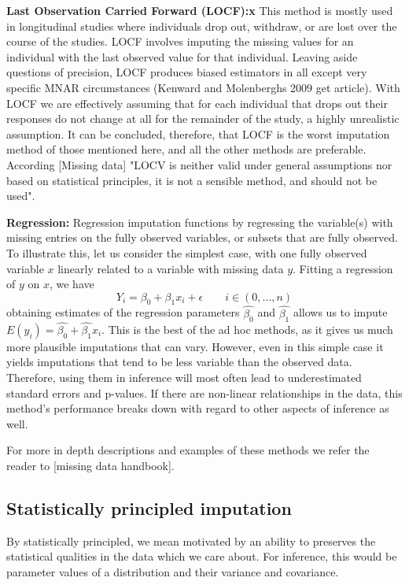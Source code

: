 \documentclass{article}
\begin{document}
	
	\textbf{Last Observation Carried Forward (LOCF):x}
	This method is mostly used in longitudinal studies where individuals drop out, withdraw, or are lost over the course of the studies. LOCF involves imputing the missing values for an individual with the last observed value for that individual. Leaving aside questions of precision, LOCF produces biased estimators in all except very specific MNAR circumstances (Kenward and Molenberghs 2009 get article). With LOCF we are effectively assuming that for each individual that drops out their responses do not change at all for the remainder of the study, a highly unrealistic assumption. It can be concluded, therefore, that LOCF is the worst imputation method of those mentioned here, and all the other methods are preferable. According [Missing data] "LOCV is neither valid under general assumptions nor based on statistical principles, it is not a sensible method, and should not be used".
	
	\textbf{Regression:}
	Regression imputation functions by regressing the variable(s) with missing entries on the fully observed variables, or subsets that are fully observed. To illustrate this, let us consider the simplest case, with one fully observed variable $x$ linearly related to a variable with missing data $y$. Fitting a regression of $y$ on $x$, we have$$Y_{i} = \beta_{0} + \beta_{1}x_{i} + \epsilon \qquad i\in(0,...,n)$$ obtaining estimates of the regression parameters $\hat{\beta_{0}}$ and $\hat{\beta_{1}}$ allows us to impute $E(y_{i}) = \hat{\beta_{0}} + \hat{\beta_{1}}x_{i}$. This is the best of the ad hoc methods, as it gives us much more plausible imputations that can vary. However, even in this simple case it yields imputations that tend to be less variable than the observed data. Therefore, using them in inference will most often lead to underestimated standard errors and p-values. If there are non-linear relationships in the data, this method's performance breaks down with regard to other aspects of inference as well.
	
	For more in depth descriptions and examples of these methods we refer the reader to [missing data handbook].
	
	\subsection{Statistically principled imputation}
	By statistically principled, we mean motivated by an ability to preserves the statistical qualities in the data which we care about. For inference, this would be parameter values of a distribution and their variance and covariance.
	
\end{document}
